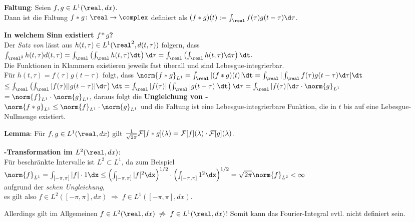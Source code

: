 \textbf{Faltung}:
Seien $f, g \in L^1(\real, dx)$.\\
Dann ist die Faltung $f \ast g\colon \real \rightarrow \complex$ definiert als
$(f \ast g)(t) := \int_\real f(\tau) g(t - \tau) \d\tau$.

\textbf{In welchem Sinn existiert $f \ast g$?}\\
Der \emph{Satz von } lässt aus
$h(t, \tau) \in L^1(\real^2, d(t, \tau))$ folgern, dass\\
$\int_{\real^2} h(t, \tau) d(t, \tau) =
\int_\real \left(\int_\real h(t, \tau) \dt\right) \d\tau =
\int_\real \left(\int_\real h(t, \tau) \d\tau\right) \dt$.\\
Die Funktionen in Klammern existieren jeweils fast überall und sind
Lebesgue-integrierbar.\\
Für $h(t, \tau) = f(\tau) g(t - \tau)$ folgt, dass
$\norm{f \ast g}_{L^1} =
\int_\real |(f \ast g)(t)| \dt =
\int_\real |\int_\real f(\tau) g(t - \tau) \d\tau| \dt$\\
$\le \int_\real \left(\int_\real |f(\tau)| |g(t - \tau)| \d\tau\right) \dt =
\int_\real |f(\tau)| \left(\int_\real |g(t - \tau)| \dt\right) \d\tau =
\int_\real |f(\tau)| \d\tau \cdot \norm{g}_{L^1}$\\
$= \norm{f}_{L^1} \cdot \norm{g}_{L^1}$,
daraus folgt die \textbf{Ungleichung von -}\\
$\norm{f \ast g}_{L^1} \le \norm{f}_{L^1} \cdot \norm{g}_{L^1}$
und die Faltung ist eine Lebesgue-integrierbare Funktion, die in $t$ bis auf
eine Lebesgue-Nullmenge existiert.

\textbf{Lemma}:
Für $f, g \in L^1(\real, dx)$ gilt
$\frac{1}{\sqrt{2\pi}} \mathcal{F}[f \ast g](\lambda) =
\mathcal{F}[f](\lambda) \cdot \mathcal{F}[g](\lambda)$.

\linie
\pagebreak

\textbf{-Transformation im $L^2(\real, dx)$}:\\
Für beschränkte Intervalle ist $L^2 \subset L^1$, da zum Beispiel\\
$\norm{f}_{L^1} = \int_{[-\pi, \pi]} |f| \cdot 1 \dx \le
\left(\int_{[-\pi, \pi]} |f|^2 \dx\right)^{1/2} \cdot
\left(\int_{[-\pi, \pi]} 1^2 \dx\right)^{1/2} =
\sqrt{2\pi} \norm{f}_{L^2} < \infty$\\
aufgrund der \emph{schen Ungleichung},\\
es gilt also $f \in L^2([-\pi, \pi], dx) \;\Rightarrow\;
f \in L^1([-\pi, \pi], dx)$.

Allerdings gilt im Allgemeinen $f \in L^2(\real, dx) \;\not\Rightarrow\;
f \in L^1(\real, dx)$!
Somit kann das Fourier-Integral evtl. nicht definiert sein.

